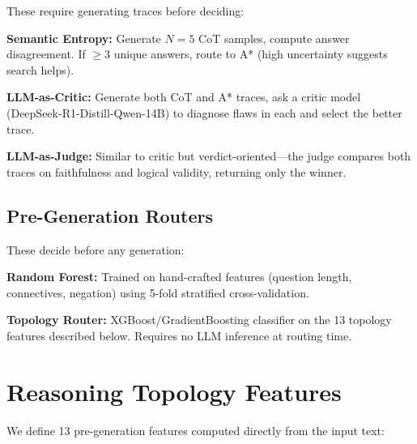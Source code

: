 These require generating traces before deciding:

\textbf{Semantic Entropy:} Generate $N=5$ CoT samples, compute answer disagreement. If $\geq 3$ unique answers, route to A* (high uncertainty suggests search helps).

\textbf{LLM-as-Critic:} Generate both CoT and A* traces, ask a critic model (DeepSeek-R1-Distill-Qwen-14B) to diagnose flaws in each and select the better trace.

\textbf{LLM-as-Judge:} Similar to critic but verdict-oriented---the judge compares both traces on faithfulness and logical validity, returning only the winner.

\subsection{Pre-Generation Routers}

These decide before any generation:

\textbf{Random Forest:} Trained on hand-crafted features (question length, connectives, negation) using 5-fold stratified cross-validation.

\textbf{Topology Router:} XGBoost/GradientBoosting classifier on the 13 topology features described below. Requires no LLM inference at routing time.

\section{Reasoning Topology Features}
\label{sec:topology_features}

We define 13 pre-generation features computed directly from the input text:

